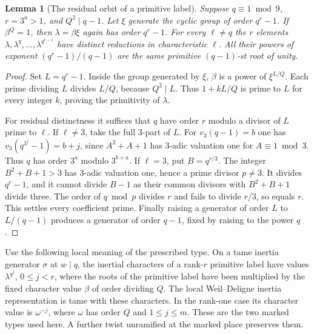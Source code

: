 \documentclass[a4paper,11pt]{article}
\newtheorem{lemma}[proposition]{Lemma}
\theoremstyle{definition}
\theoremstyle{remark}
\numberwithin{equation}{section}
\begin{document}
\begin{lemma}[The residual orbit of a primitive label]\leavevmode
\label{lem:tameorbit715}
Suppose \(q\equiv1\bmod 9\), \(r=3^a>1\), and \(Q^2\mid q-1\).
Let \(\xi\) generate the cyclic group of order \(q^r-1\).
If \(\beta^Q=1\), then \(\lambda=\beta\xi\) again has order
\(q^r-1\). For every \(\ell\ne q\) the \(r\) elements
\(\lambda,\lambda^q,\ldots,\lambda^{q^{r-1}}\) have distinct
reductions in characteristic \(\ell\). All their powers of
exponent \((q^r-1)/(q-1)\) are the same primitive
\((q-1)\)-st root of unity.
\end{lemma}
\begin{proof}
Set \(L=q^r-1\). Inside the group generated by \(\xi\),
\(\beta\) is a power of \(\xi^{L/Q}\). Each prime dividing
\(L\) divides \(L/Q\), because \(Q^2\mid L\). Thus
\(1+kL/Q\) is prime to \(L\) for every integer \(k\), proving
the primitivity of \(\lambda\).

For residual distinctness it suffices that \(q\) have order
\(r\) modulo a divisor of \(L\) prime to \(\ell\). If
\(\ell\ne3\), take the full \(3\)-part of \(L\). For
\(v_3(q-1)=b\) one has \(v_3(q^{3^j}-1)=b+j\), since
\(A^2+A+1\) has \(3\)-adic valuation one for \(A\equiv1\bmod3\).
Thus \(q\) has order \(3^a\) modulo \(3^{b+a}\). If
\(\ell=3\), put \(B=q^{r/3}\). The integer \(B^2+B+1>3\)
has \(3\)-adic valuation one, hence a prime divisor \(p\ne3\).
It divides \(q^r-1\), and it cannot divide \(B-1\) as their
common divisors with \(B^2+B+1\) divide three. The order
of \(q\bmod p\) divides \(r\) and fails to divide \(r/3\),
so equals \(r\). This settles every coefficient prime.
Finally raising a generator of order \(L\) to \(L/(q-1)\)
produces a generator of order \(q-1\), fixed by raising to
the power \(q\).
\end{proof}

Use the following local meaning of the prescribed type. On a
tame inertia generator \(\sigma\) at \(w\mid q\), the
inertial characters of a rank-\(r\) primitive label have
values \(\lambda^{q^j}\), \(0\le j<r\), where the roots of
the primitive label have been multiplied by the fixed
character value \(\beta\) of order dividing \(Q\).
The local Weil--Deligne inertia representation is tame
with these characters. In the rank-one case its character
value is \(\omega^{-j}\), where \(\omega\) has order \(Q\)
and \(1\le j\le m\). These are the two marked types used
here. A further twist unramified at the marked place
preserves them.
\end{document}
